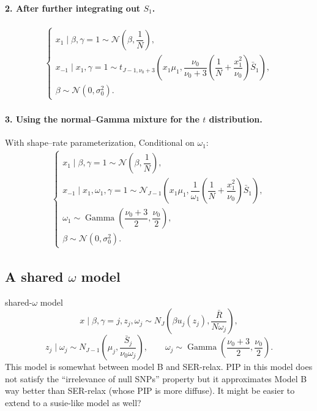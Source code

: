 \documentclass[11pt]{article}
\newcommand{\Gam}{\operatorname{Gamma}}
\newcommand{\Normal}{\mathcal N}
\begin{document}
\paragraph{2. After further integrating out $S_1$.}
\begin{align}\label{eq:model-B2}
\begin{cases}
x_1\mid \beta,\gamma=1
\sim
\Normal\left(\beta,\dfrac{1}{N}\right),\\
x_{-1}\mid x_1,\gamma=1
\sim
t_{J-1,\nu_0+3}\left(
x_1\mu_1,
\dfrac{\nu_0}{\nu_0+3}
\left(\dfrac{1}{N}+\dfrac{x_1^2}{\nu_0}\right)\bar S_1
\right),\\
\beta\sim\Normal(0,\sigma_0^2).
\end{cases}
\end{align}

\paragraph{3. Using the normal--Gamma mixture for the $t$ distribution.}
With shape--rate parameterization,
Conditional on $\omega_1$:
\begin{align}\label{eq:model-B3p}
\begin{cases}
x_1\mid \beta,\gamma=1
\sim
\Normal\left(\beta,\dfrac{1}{N}\right),\\
x_{-1}\mid x_1,\omega_1,\gamma=1
\sim
\Normal_{J-1}\left(
x_1\mu_1,
\dfrac{1}{\omega_1}
\left(\dfrac{1}{N}+\dfrac{x_1^2}{\nu_0}\right)\bar S_1
\right),\\
\omega_1\sim\Gam\left(\dfrac{\nu_0+3}{2},\dfrac{\nu_0}{2}\right),\\
\beta\sim\Normal(0,\sigma_0^2).
\end{cases}
\end{align}

\subsection{A shared $\omega$ model}
shared-\(\omega\) model
\[
x\mid \beta,\gamma=j,z_j,\omega_j
\sim
N_J\left(\beta u_j(z_j),\frac{\bar R}{N\omega_j}\right),
\]
\[
z_j\mid\omega_j
\sim
N_{J-1}\left(\mu_j,\frac{\bar S_j}{\nu_0\omega_j}\right),
\qquad
\omega_j\sim
\operatorname{Gamma}\left(\frac{\nu_0+3}{2},\frac{\nu_0}{2}\right).
\]
This model is somewhat between model B and SER-relax. PIP in this model does not satisfy the ``irrelevance of null SNPs'' property but it approximates Model B way better than SER-relax (whose PIP is more diffuse).  It might be easier to extend to a susie-like model as well?
\end{document}
